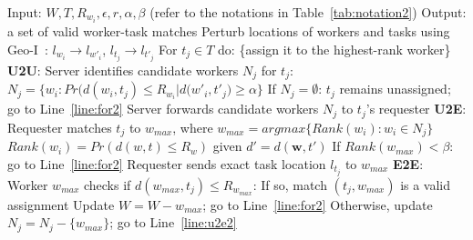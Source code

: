 \documentclass{USC-Thesis}
\renewcommand{\sc}{\textsc}
\numberwithin{equation}{chapter}
\begin{document}
\begin{algorithm} [ht]
\caption{\sc Probability-based Algorithm}
\small
\begin{algorithmic}[1]
\STATE Input: $W, T, R_{w_i}, \epsilon, r, \alpha, \beta$ (refer to the notations in Table~\ref{tab:notation2})
\STATE Output: a set of valid worker-task matches
\STATE Perturb locations of workers and tasks using Geo-I~\cite{andres2013geo}:
\STATE \hspace{6pt} $l_{w_i}\rightarrow l_{w'_i}$, $l_{t_j}\rightarrow l_{t'_j}$
\STATE For $t_j\in T$ do: \{assign it to the highest-rank worker\} \label{line:for2}
\STATE \hspace{6pt} \textbf{U2U}: Server identifies candidate workers $N_j$ for $t_j$:
\STATE \hspace{18pt} $N_j=\mathit{\{w_i : Pr\big(d(w_i, t_j)\le R_{w_i} | d(w'_i, t'_j\big) \ge \alpha}\}$ \label{line:pruning}
\STATE \hspace{12pt} If $N_j=\emptyset$: $t_j$ remains unassigned; go to Line~\ref{line:for2} \label{line:next2}
\STATE \hspace{12pt} Server forwards candidate workers $N_j$ to $t_j$'s requester
\STATE \hspace{6pt} \textbf{U2E}: Requester matches $t_j$ to $\mathit{w_{max}}$, where \label{line:u2e2}
\STATE \hspace{12pt} $\mathit{w_{max}=argmax\{Rank(w_i):w_i\in N_j\}}$ 
\STATE \hspace{18pt} $\mathit{Rank(w_i)=Pr(d(w, t)\le R_w)}$ given $\mathit{d'=d(\textbf{w},t')}$ \label{line:rank2}
\STATE \hspace{18pt} If $\mathit{Rank(w_{max}) < \beta}$: go to Line~\ref{line:for2} \label{line:alpha}
\STATE \hspace{12pt} Requester sends exact task location $l_{t_j}$ to $\mathit{w_{max}}$ \label{line:send}
\STATE \hspace{6pt} \textbf{E2E}: Worker $\mathit{w_{max}}$ checks if $\mathit{d(w_{max}, t_j) \le R_{w_{max}}}$: 
\STATE \hspace{12pt} If so, match $(t_j,w_{max})$ is a valid assignment
\STATE \hspace{18pt} Update $\mathit{W=W-{w_{max}}}$; go to Line~\ref{line:for2}
\STATE \hspace{12pt} Otherwise, update $\mathit{N_j=N_j-\{w_{max}\}}$; go to Line~\ref{line:u2e2}
\end{algorithmic}
\label{alg:probabilistic}
\end{algorithm}
\end{document}
